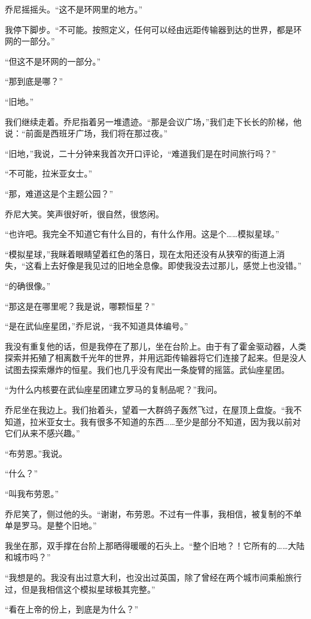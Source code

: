 \documentclass[AutoFakeBold=true]{book}
\begin{document}
乔尼摇摇头。``这不是环网里的地方。''

我停下脚步。``不可能。按照定义，任何可以经由远距传输器到达的世界，都是环网的一部分。''

``但这不是环网的一部分。''

``那到底是哪？''

``旧地。''

我们继续走着。乔尼指着另一堆遗迹。``那是会议广场，''我们走下长长的阶梯，他说：``前面是西班牙广场，我们将在那过夜。''

``旧地，''我说，二十分钟来我首次开口评论，``难道我们是在时间旅行吗？''

``不可能，拉米亚女士。''

``那，难道这是个主题公园？''

乔尼大笑。笑声很好听，很自然，很悠闲。

``也许吧。我完全不知道它有什么目的，有什么作用。这是个……模拟星球。''

``模拟星球，''我眯着眼睛望着红色的落日，现在太阳还没有从狭窄的街道上消失，``这看上去好像是我见过的旧地全息像。即使我没去过那儿，感觉上也没错。''

``的确很像。''

``那这是在哪里呢？我是说，哪颗恒星？''

``是在武仙座星团，''乔尼说，``我不知道具体编号。''

我没有重复他的话，但是我停在了那儿，坐在台阶上。由于有了霍金驱动器，人类探索并拓殖了相离数千光年的世界，并用远距传输器将它们连接了起来。但是没人试图去探索爆炸的恒星。我们也几乎没有爬出一条旋臂的摇篮。武仙座星团。

``为什么内核要在武仙座星团建立罗马的复制品呢？''我问。

乔尼坐在我边上。我们抬着头，望着一大群鸽子轰然飞过，在屋顶上盘旋。``我不知道，拉米亚女士。我有很多不知道的东西……至少是部分不知道，因为我以前对它们从来不感兴趣。''

``布劳恩。''我说。

``什么？''

``叫我布劳恩。''

乔尼笑了，侧过他的头。``谢谢，布劳恩。不过有一件事，我相信，被复制的不单单是罗马。是整个旧地。''

我坐在那，双手撑在台阶上那晒得暖暖的石头上。``整个旧地？！它所有的……大陆和城市吗？''

``我想是的。我没有出过意大利，也没出过英国，除了曾经在两个城市间乘船旅行过，但是我相信这个模拟星球极其完整。''

``看在上帝的份上，到底是为什么？''
\end{document}
